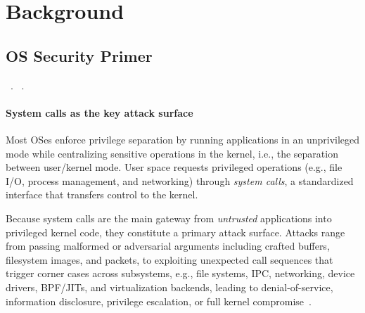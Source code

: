 \section{Background}
\subsection{OS Security Primer}
\label{sec:bkgd:os}

~. ~. 

\paragraph{\textbf{System calls as the key attack surface}}
Most OSes enforce privilege separation by running applications in an unprivileged mode while centralizing sensitive operations in the kernel, i.e., the separation between user/kernel mode. User space requests privileged operations (e.g., file I/O, process management, and networking) through \textit{system calls}, a standardized interface that transfers control to the kernel.

Because system calls are the main gateway from \textit{untrusted} applications into privileged kernel code, they constitute a primary attack surface. 
Attacks range from passing malformed or adversarial arguments including crafted buffers, filesystem images, and packets, to exploiting unexpected call sequences that trigger corner cases across subsystems, e.g., file systems, IPC, networking, device drivers, BPF/JITs, and virtualization backends, leading to denial-of-service, information disclosure, privilege escalation, or full kernel compromise~\cite{chen2011linux}.


